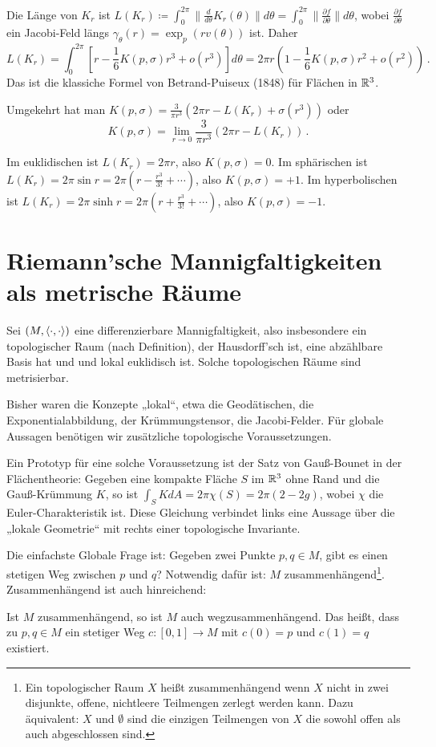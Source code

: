 \documentclass[a4paper,twoside,DIV15,BCOR12mm]{scrbook}
\renewcommand{\da}{\coloneqq}
\begin{document}
\begin{beispiel}
Die Länge von $K_r$ ist $L(K_r)\da \int_{0}^{2\pi} \|\frac d{d\theta} K_r(\theta) \| d\theta = \int_0^{2\pi} \|\frac{\partial f}{\partial \theta}\|d\theta $, wobei $\frac{\partial f}{\partial \theta}$ ein Jacobi-Feld längs $\gamma_\theta(r) = \exp_p(rv(\theta))$ ist. Daher \[ L(K_r) = \int_0^{2\pi} [r - \frac 1 6 K(p,\sigma) r^3 + o(r^3)] d\theta = 2\pi r(1 - \frac 1 6 K(p,\sigma)r^2 + o(r^2))\,.\] Das ist die klassiche Formel von Betrand-Puiseux (1848) für Flächen in $\mathbb{R}^3$.

Umgekehrt hat man $K(p,\sigma) = \frac3{\pi r^3} (2\pi r - L(K_r) + \sigma(r^3))$ oder \[ K(p,\sigma) = \lim_{r\to0} \frac 3{\pi r^3}(2\pi r - L(K_r))\,.\]

Im euklidischen ist $L(K_r) = 2\pi r$, also $K(p,\sigma) = 0$. Im sphärischen ist $L(K_r) = 2\pi \sin r = 2\pi(r - \frac{r^3}{3!} + \cdots )$, also $K(p,\sigma) = +1$. Im hyperbolischen ist $L(K_r) = 2\pi \sinh r = 2\pi (r + \frac{r^3}{3!} +\cdots)$, also $K(p,\sigma) = -1$.

\end{beispiel}



\chapter{Riemann’sche Mannigfaltigkeiten als metrische Räume}

Sei $(M,\langle\cdot,\cdot\rangle)$ eine differenzierbare Mannigfaltigkeit, also insbesondere ein topologischer Raum (nach Definition), der Hausdorff’sch ist, eine abzählbare Basis hat und und lokal euklidisch ist. Solche topologischen Räume sind metrisierbar.

Bisher waren die Konzepte „lokal“, etwa die Geodätischen, die Exponentialabbildung, der Krümmungstensor, die Jacobi-Felder. Für globale Aussagen benötigen wir zusätzliche topologische Voraussetzungen.

Ein Prototyp für eine solche Voraussetzung ist der Satz von Gauß-Bounet in der Flächentheorie: Gegeben eine kompakte Fläche $S$ im $\mathbb{R}^3$ ohne Rand und die Gauß-Krümmung $K$, so ist $\int_S KdA = 2\pi \chi(S) = 2\pi (2 - 2g)$, wobei $\chi$ die Euler-Charakteristik ist. Diese Gleichung verbindet links eine Aussage über die „lokale Geometrie“ mit rechts einer topologische Invariante.

Die einfachste Globale Frage ist: Gegeben zwei Punkte $p,q\in M$, gibt es einen stetigen Weg zwischen $p$ und $q$? Notwendig dafür ist: $M$ zusammenhängend\footnote{Ein topologischer Raum $X$ heißt zusammenhängend wenn $X$ nicht in zwei disjunkte, offene, nichtleere Teilmengen zerlegt werden kann. Dazu äquivalent: $X$ und $\emptyset$ sind die einzigen Teilmengen von $X$ die sowohl offen als auch abgeschlossen sind.}. Zusammenhängend ist auch hinreichend:
\begin{lemma}
Ist $M$ zusammenhängend, so ist $M$ auch wegzusammenhängend. Das heißt, dass zu $p,q\in M$ ein stetiger Weg $c:[0,1]\to M$ mit $c(0)=p$ und $c(1)=q$ existiert.
\end{lemma}
\end{document}
